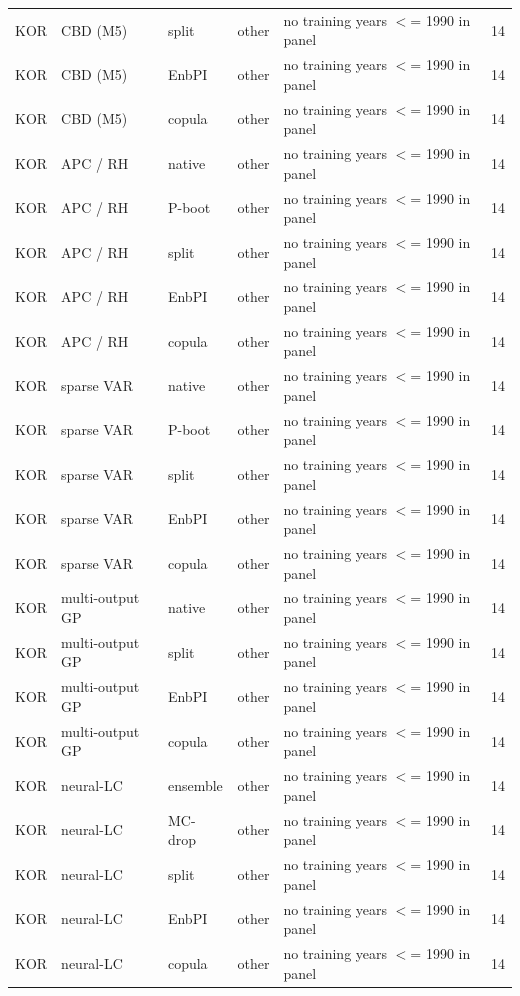{\begin{longtable}{@{}lllp{1.6cm}p{6.2cm}r@{}}
KOR & CBD (M5) & split & other & no training years $<$= 1990 in panel & 14 \\
KOR & CBD (M5) & EnbPI & other & no training years $<$= 1990 in panel & 14 \\
KOR & CBD (M5) & copula & other & no training years $<$= 1990 in panel & 14 \\
KOR & APC / RH & native & other & no training years $<$= 1990 in panel & 14 \\
KOR & APC / RH & P-boot & other & no training years $<$= 1990 in panel & 14 \\
KOR & APC / RH & split & other & no training years $<$= 1990 in panel & 14 \\
KOR & APC / RH & EnbPI & other & no training years $<$= 1990 in panel & 14 \\
KOR & APC / RH & copula & other & no training years $<$= 1990 in panel & 14 \\
KOR & sparse VAR & native & other & no training years $<$= 1990 in panel & 14 \\
KOR & sparse VAR & P-boot & other & no training years $<$= 1990 in panel & 14 \\
KOR & sparse VAR & split & other & no training years $<$= 1990 in panel & 14 \\
KOR & sparse VAR & EnbPI & other & no training years $<$= 1990 in panel & 14 \\
KOR & sparse VAR & copula & other & no training years $<$= 1990 in panel & 14 \\
KOR & multi-output GP & native & other & no training years $<$= 1990 in panel & 14 \\
KOR & multi-output GP & split & other & no training years $<$= 1990 in panel & 14 \\
KOR & multi-output GP & EnbPI & other & no training years $<$= 1990 in panel & 14 \\
KOR & multi-output GP & copula & other & no training years $<$= 1990 in panel & 14 \\
KOR & neural-LC & ensemble & other & no training years $<$= 1990 in panel & 14 \\
KOR & neural-LC & MC-drop & other & no training years $<$= 1990 in panel & 14 \\
KOR & neural-LC & split & other & no training years $<$= 1990 in panel & 14 \\
KOR & neural-LC & EnbPI & other & no training years $<$= 1990 in panel & 14 \\
KOR & neural-LC & copula & other & no training years $<$= 1990 in panel & 14 \\

\end{longtable}}
